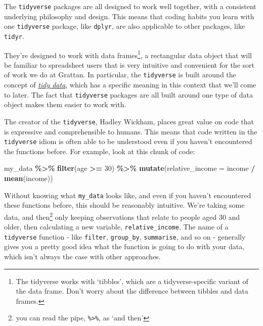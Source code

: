 \documentclass[
]{book}
\newenvironment{Shaded}{\begin{snugshade}}{\end{snugshade}}
\newcommand{\DataTypeTok}[1]{\textcolor[rgb]{0.13,0.29,0.53}{#1}}
\newcommand{\DecValTok}[1]{\textcolor[rgb]{0.00,0.00,0.81}{#1}}
\newcommand{\KeywordTok}[1]{\textcolor[rgb]{0.13,0.29,0.53}{\textbf{#1}}}
\newcommand{\NormalTok}[1]{#1}
\newcommand{\OperatorTok}[1]{\textcolor[rgb]{0.81,0.36,0.00}{\textbf{#1}}}
\newcommand{\StringTok}[1]{\textcolor[rgb]{0.31,0.60,0.02}{#1}}
\begin{document}
The \texttt{tidyverse} packages are all designed to work well together, with a consistent underlying philosophy and design. This means that coding habits you learn with one \texttt{tidyverse} package, like \texttt{dplyr}, are also applicable to other packages, like \texttt{tidyr}.

They're designed to work with data frames\footnote{The tidyverse works with `tibbles', which are a tidyverse-specific variant of the data frame. Don't worry about the difference between tibbles and data frames.}, a rectangular data object that will be familiar to spreadsheet users that is very intuitive and convenient for the sort of work we do at Grattan. In particular, the \texttt{tidyverse} is built around the concept of \href{https://cran.r-project.org/web/packages/tidyr/vignettes/tidy-data.html}{\emph{tidy data}}, which has a specific meaning in this context that we'll come to later. The fact that \texttt{tidyverse} packages are all built around one type of data object makes them easier to work with.

The creator of the \texttt{tidyverse}, Hadley Wickham, places great value on code that is expressive and comprehensible to humans. This means that code written in the \texttt{tidyverse} idiom is often able to be understood even if you haven't encountered the functions before. For example, look at this chunk of code:

\begin{Shaded}
\begin{Highlighting}[]
\NormalTok{my\_data }\OperatorTok{\%\textgreater{}\%}
\StringTok{  }\KeywordTok{filter}\NormalTok{(age }\OperatorTok{\textgreater{}=}\StringTok{ }\DecValTok{30}\NormalTok{) }\OperatorTok{\%\textgreater{}\%}
\StringTok{  }\KeywordTok{mutate}\NormalTok{(}\DataTypeTok{relative\_income =}\NormalTok{ income }\OperatorTok{/}\StringTok{ }\KeywordTok{mean}\NormalTok{(income))}
\end{Highlighting}
\end{Shaded}

Without knowing what \texttt{my\_data} looks like, and even if you haven't encountered these functions before, this should be reasonably intuitive. We're taking some data, and then\footnote{you can read the pipe, \texttt{\%\textgreater{}\%}, as `and then'} only keeping observations that relate to people aged 30 and older, then calculating a new variable, \texttt{relative\_income}. The name of a \texttt{tidyverse} function - like \texttt{filter}, \texttt{group\_by}, \texttt{summarise}, and so on - generally gives you a pretty good idea what the function is going to do with your data, which isn't always the case with other approaches.
\end{document}
